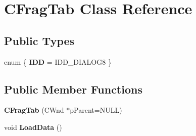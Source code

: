 \hypertarget{class_c_frag_tab}{\section{C\-Frag\-Tab Class Reference}
\label{class_c_frag_tab}
}
\subsection*{Public Types}
\begin{DoxyCompactItemize}
\item 
enum \{ {\bfseries I\-D\-D} =  I\-D\-D\-\_\-\-D\-I\-A\-L\-O\-G8
 \}
\end{DoxyCompactItemize}
\subsection*{Public Member Functions}
\begin{DoxyCompactItemize}
\item 
\hypertarget{class_c_frag_tab_ac814e92a3fe8e632076b73517dea01bb}{{\bfseries C\-Frag\-Tab} (C\-Wnd $\ast$p\-Parent=N\-U\-L\-L)}\label{class_c_frag_tab_ac814e92a3fe8e632076b73517dea01bb}

\item 
\hypertarget{class_c_frag_tab_abca574a6a059d9ff4022d6f19364fd41}{void {\bfseries Load\-Data} ()}\label{class_c_frag_tab_abca574a6a059d9ff4022d6f19364fd41}

\end{DoxyCompactItemize}
